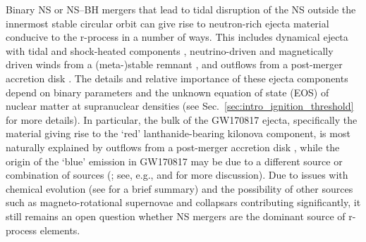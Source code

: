 Binary NS or NS--BH mergers that lead to tidal disruption of the NS outside the innermost stable circular orbit can give rise to neutron-rich ejecta material conducive to the r-process in a number of ways. This includes dynamical ejecta with tidal and shock-heated components \cite{ruffert_coalescing_1997-1,rosswog_mass_1999,oechslin_relativistic_2007,hotokezaka_mass_2013,hotokezaka_progenitor_2013}, neutrino-driven and magnetically driven winds from a (meta-)stable remnant \cite{dessart_neutrino_2009,siegel_magnetically_2014,ciolfi_general_2017,ciolfi_first_2019}, and outflows from a post-merger accretion disk \cite{fernandez_delayed_2013,just_comprehensive_2015,siegel_three-dimensional_2017}. The details and relative importance of these ejecta components depend on binary parameters and the unknown equation of state (EOS) of nuclear matter at supranuclear densities (see Sec.~\ref{sec:intro_ignition_threshold} for more details). In particular, the bulk of the GW170817 ejecta, specifically the material giving rise to the `red' lanthanide-bearing kilonova component, is most naturally explained by outflows from a post-merger accretion disk \cite{kasen_origin_2017,siegel_three-dimensional_2017}, while the origin of the `blue' emission in GW170817 may be due to a different source or combination of sources (\cite{siegel_three-dimensional_2018,fernandez_long-term_2019,miller_full_2019-1,nedora_spiral-wave_2019,metzger_magnetar_2018,ciolfi_magnetically_2020}; see, e.g., \cite{metzger_kilonovae_2019} and \cite{siegel_gw170817_2019} for more discussion). Due to issues with chemical evolution (see \cite{siegel_gw170817_2019} for a brief summary) and the possibility of other sources such as magneto-rotational supernovae \cite{winteler_magnetorotationally_2012,halevi_r-process_2018} and collapsars \cite{siegel_collapsars_2019} contributing significantly, it still remains an open question whether NS mergers are the dominant source of r-process elements.

